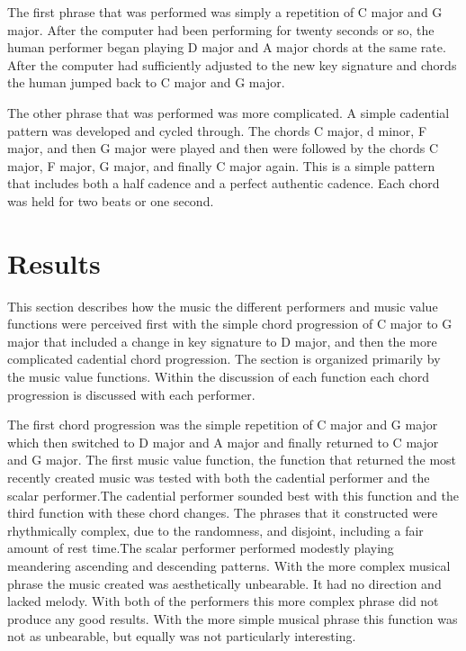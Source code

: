 \documentclass[12pt]{ucthesis}
\begin{document}
The first phrase that was performed was simply a repetition of C major and G major. After the computer had been performing for twenty seconds or so, the human performer began playing D major and A major chords at the same rate. After the computer had sufficiently adjusted to the new key signature and chords the human jumped back to C major and G major. 

The other phrase that was performed was more complicated. A simple cadential pattern was developed and cycled through. The chords C major, d minor, F major, and then G major were played and then were followed by the chords C major, F major, G major, and finally C major again. This is a simple pattern that includes both a half cadence and a perfect authentic cadence. Each chord was held for two beats or one second.

\chapter{Results}
\label{results}
This section describes how the music the different performers and music value functions were perceived first with the simple chord progression of C major to G major that included a change in key signature to D major, and then the more complicated cadential chord progression. The section is organized primarily by the music value functions. Within the discussion of each function each chord progression is discussed with each performer. 

The first chord progression was the simple repetition of C major and G major which then switched to D major and A major and finally returned to C major and G major. The first music value function, the function that returned the most recently created music was tested with both the cadential performer and the scalar performer.The cadential performer sounded best with this function and the third function with these chord changes. The phrases that it constructed were rhythmically complex, due to the randomness, and disjoint, including a fair amount of rest time.The scalar performer performed modestly playing meandering ascending and descending patterns. With the more complex musical phrase the music created was aesthetically unbearable. It had no direction and lacked melody. With both of the performers this more complex phrase did not produce any good results. With the more simple musical phrase this function was not as unbearable, but equally was not particularly interesting.
\end{document}
